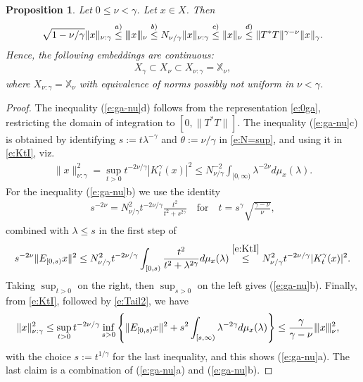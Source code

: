 \documentclass[10pt, a4paper]{iopart}
\newcommand{\IX}{\mathbb{X}}
\newcommand{\norm}[2]{     \| #1       \|_{ #2 }}
\newcommand{\normiii}[2]{\vert\kern-0.25ex\vert\kern-0.25ex\vert #1 \vert\kern-0.25ex \vert\kern-0.25ex\vert_{ #2 }}
\newtheorem{proposition}[lemma]{Proposition}
\theoremstyle{remark}
\theoremstyle{definition}
\begin{document}
\begin{proposition}
\label{p:ga-nu}
	Let $0 \leq \nu < \gamma$.
	Let $x \in X$.
	Then
	\begin{align}
	\label{e:ga-nu}
		\sqrt{ 1 - \nu / \gamma }
		\norm{x}{\nu : \gamma}
	\stackrel{a)}{\leq}
		\normiii{x}{\nu}
	\stackrel{b)}{\leq}
		N_{\nu / \gamma}
		\norm{x}{\nu : \gamma}
	\stackrel{c)}{\leq}
		\norm{x}{\nu}
	\stackrel{d)}{\leq}
		\norm{T^* T}{}^{\gamma - \nu}
		\norm{x}{\gamma}
	.
	\end{align}
	Hence, the following embeddings are continuous:
	\begin{align}
		X_{\gamma}
		\subset
		X_\nu
		\subset
		X_{\nu : \gamma}
		=
		\IX_\nu
		,
	\end{align}
	where
	$X_{\nu : \gamma} = \IX_\nu$ 
	with equivalence of norms 
	possibly not uniform in $\nu < \gamma$.
\end{proposition}
%
%
\begin{proof}
	The inequality
	(\ref{e:ga-nu}d) follows
	from
	the representation \eqref{e:0ga},
	restricting the domain of integration
	to $[0, \norm{T^* T}{}]$.
	The inequality (\ref{e:ga-nu}c)
	is obtained by 
	identifying $s := t \lambda^{-\gamma}$ and $\theta := \nu / \gamma$
	in \eqref{e:N=sup},
	and using it in \eqref{e:KtI},
	viz.~%
	\begin{align}
		\norm{x}{\nu : \gamma}^2 
		= 
		\sup_{t > 0} t^{-2 \nu/\gamma} |K_t^\gamma(x)|^2
		\leq
		N_{\nu / \gamma}^{-2}
		\int_{[0, \infty)} \lambda^{-2 \nu} d \mu_x(\lambda)
		.
	\end{align}
	For the inequality (\ref{e:ga-nu}b)
	we use the identity
	\begin{align}
		s^{-2\nu}
		=
		N_{\nu/\gamma}^2
		t^{-2\nu/\gamma}
		\frac{ t^2 }{ t^2 + s^{2 \gamma} }
		\quad\text{for}\quad
		t = 
		s^\gamma
		\sqrt{ \frac{\gamma - \nu}{\nu} }
		,
	\end{align}
	combined with $\lambda \leq s$
	in the first step of 
	\begin{align*}
		s^{-2\nu}
		\norm{
			E_{[0, s)} x
		}{}^2
		\leq
		N_{\nu/\gamma}^2
		t^{-2\nu/\gamma}
		\int_{[0, s)}
		\frac{ t^2 }{ t^2 + \lambda^{2 \gamma} }
		d\mu_x(\lambda)
		\stackrel{\eqref{e:KtI}}{\leq}
		N_{\nu/\gamma}^2
		t^{-2\nu/\gamma}
		| K_t^\gamma(x) |^2
		.
	\end{align*}
	Taking
	$\sup_{t > 0}$ on the right,
	then
	$\sup_{s > 0}$ on the left
	gives (\ref{e:ga-nu}b).
	Finally,
	from \eqref{e:KtI}, 
	followed by \eqref{e:Tail2},
	we have 
	\begin{align*}
		\norm{x}{\nu:\gamma}^2
	& \leq
		\sup_{t > 0} t^{-2 \nu/\gamma}
		\inf_{s > 0}
		\left\{
			\norm{
				E_{[0, s)} x
			}{}^2
			+
			s^2 \int_{[s, \infty)} \lambda^{-2\gamma} d \mu_x(\lambda)
		\right\}
	\leq
		\frac{\gamma}{\gamma - \nu}
		\normiii{x}{\nu}^2
		,
	\end{align*}
	with the choice $s := t^{1/\gamma}$ for the last inequality,
	and this shows (\ref{e:ga-nu}a).
	The last claim is a combination of (\ref{e:ga-nu}a) and (\ref{e:ga-nu}b).
\end{proof}
\end{document}
